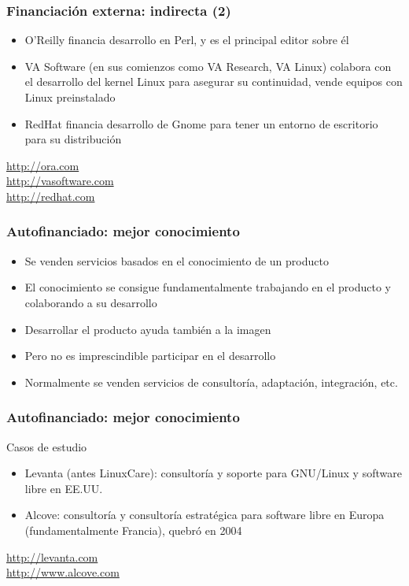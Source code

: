 \begin{frame}
\frametitle{Financiación externa: indirecta (2)}

\begin{itemize}
\item O'Reilly financia desarrollo en Perl, y es el
  principal editor sobre él
\item VA Software (en sus comienzos como VA Research, VA Linux) colabora con el
  desarrollo del kernel Linux para asegurar su continuidad, vende
  equipos con Linux preinstalado
\item RedHat financia desarrollo de Gnome para tener un entorno de
  escritorio para su distribución
\end{itemize}

\begin{flushright}
\url{http://ora.com} \\
\url{http://vasoftware.com} \\
\url{http://redhat.com}
\end{flushright}
\end{frame}


\begin{frame}
\frametitle{Autofinanciado: mejor conocimiento}

\begin{itemize}
\item Se venden servicios basados en el conocimiento de un producto
\item El conocimiento se consigue fundamentalmente trabajando en el
  producto y colaborando a su desarrollo
\item Desarrollar el producto ayuda también a la imagen
\item Pero no es imprescindible participar en el desarrollo
\item Normalmente se venden servicios de consultoría, adaptación,
  integración, etc.
\end{itemize}
\end{frame}


\begin{frame}
\frametitle{Autofinanciado: mejor conocimiento}

Casos de estudio
\begin{itemize}
\item Levanta (antes LinuxCare): consultoría y soporte para GNU/Linux
  y software libre en EE.UU.
\item Alcove: consultoría y consultoría estratégica para software
  libre en Europa (fundamentalmente Francia), quebró en 2004
\end{itemize}

\begin{flushright}
\url{http://levanta.com} \\
\url{http://www.alcove.com}
\end{flushright}

\end{frame}

